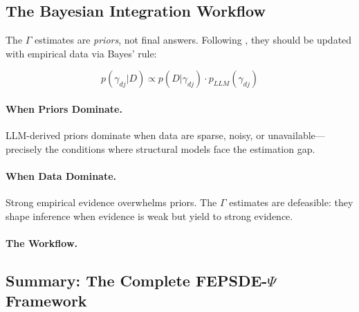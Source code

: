 \subsection{The Bayesian Integration Workflow}

The $\Gamma$ estimates are \emph{priors}, not final answers. Following \citet{llmpriors2025scientific},
they should be updated with empirical data via Bayes' rule:

\begin{equation}
  p(\gamma_{dj} | D) \propto p(D | \gamma_{dj}) \cdot p_{LLM}(\gamma_{dj})
\end{equation}

\paragraph{When Priors Dominate.}
LLM-derived priors dominate when data are sparse, noisy, or unavailable---precisely the conditions
where structural models face the estimation gap.

\paragraph{When Data Dominate.}
Strong empirical evidence overwhelms priors. The $\Gamma$ estimates are defeasible:
they shape inference when evidence is weak but yield to strong evidence.

\paragraph{The Workflow.}
\begin{center}
\end{center}

\subsection{Summary: The Complete FEPSDE-$\Psi$ Framework}

